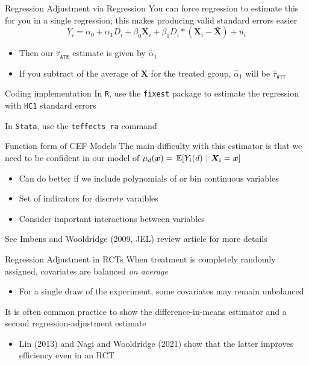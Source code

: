 \documentclass[aspectratio=169,t,11pt,table]{beamer}
\begin{document}
\begin{frame}{Regression Adjustment via Regression}
  You can force regression to estimate this for you in a single regression; this makes producing valid standard errors easier
  $$
    Y_i = \alpha_0 + \alpha_1 D_i + \beta_0 \bm{X}_i + \beta_1 D_i * (\bm{X}_i - \bar{\bm{X}}) + u_i
  $$
  \begin{itemize}
    \item Then our $\hat{\tau}_{\texttt{ATE}}$ estimate is given by $\hat{\alpha}_1$
    \item If you subtract of the average of $\bm{X}$ for the treated group, $\hat{\alpha}_1$ will be $\hat{\tau}_{\texttt{ATT}}$
  \end{itemize}
\end{frame}

\begin{frame}{Coding implementation}
  In \texttt{R}, use the \texttt{fixest} package to estimate the regression with \texttt{HC1} standard errors

  \bigskip
  In \texttt{Stata}, use the \texttt{teffects ra} command
\end{frame}

\begin{frame}{Function form of CEF Models}
  The main difficulty with this estimator is that we need to be confident in our model of $\mu_d(\bm{x}) = \expec{Y_i(d)}{\bm{X}_i = \bm{x}}$
  \begin{itemize}
    \item Can do better if we include polynomials of or bin continuous variables 
    \item Set of indicators for discrete varaibles
    \item Consider important interactions between variables
  \end{itemize}

  \bigskip
  See Imbens and Wooldridge (2009, JEL) review article for more details
\end{frame}

\begin{frame}{Regression Adjustment in RCTs}
  When treatment is completely randomly assigned, covariates are balanced \emph{on average}
  \begin{itemize}
    \item For a single draw of the experiment, some covariates may remain unbalanced
  \end{itemize}

  \pause
  \bigskip
  It is often common practice to show the difference-in-means estimator and a second regression-adjustment estimate
  \begin{itemize}
    \item Lin (2013) and Nagi and Wooldridge (2021) show that the latter improves efficiency even in an RCT
  \end{itemize}
\end{frame}
\end{document}
